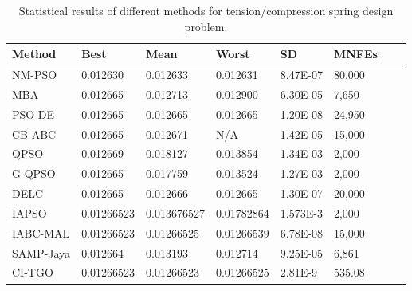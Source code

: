 
\begin{table*}[tp]
    \tiny
\begin{center}

\begin{tabular}{ P{2.0cm} P{2.0cm} P{2.0cm} P{2.0cm} P{2.0cm} P{2.0cm} P{2.0cm} P{2.0cm}  }
\hline
\textbf{Method} & \textbf{Best} & \textbf{Mean} & \textbf{Worst} & \textbf{SD} & \textbf{MNFEs} \\
\hline

NM-PSO & 0.012630 & 0.012633 & 0.012631 & 8.47E-07 & 80,000 \\
MBA & 0.012665 & 0.012713 & 0.012900 & 6.30E-05 & 7,650 \\
PSO-DE & 0.012665 & 0.012665 & 0.012665 & 1.20E-08 & 24,950 \\
CB-ABC & 0.012665 & 0.012671 & N/A & 1.42E-05 & 15,000 \\
QPSO & 0.012669 & 0.018127 & 0.013854 & 1.34E-03 & 2,000 \\
G-QPSO & 0.012665 & 0.017759 & 0.013524 & 1.27E-03 & 2,000 \\
DELC & 0.012665 & 0.012666 & 0.012665 & 1.30E-07 & 20,000 \\
IAPSO & 0.01266523 & 0.013676527 & 0.01782864 & 1.573E-3 & 2,000 \\
IABC-MAL & 0.01266523 & 0.01266525 & 0.01266539 & 6.78E-08 & 15,000 \\
SAMP-Jaya & 0.012664 & 0.013193 & 0.012714 & 9.25E-05 & 6,861 \\
CI-TGO & 0.01266523 & 0.01266523 & 0.01266525 & 2.81E-9 & 535.08 \\

\hline
\end{tabular}
\end{center}

\caption{ Statistical results of different methods for tension/compression spring design problem. \\[1em]}
\label{tab:TC}
\end{table*}

